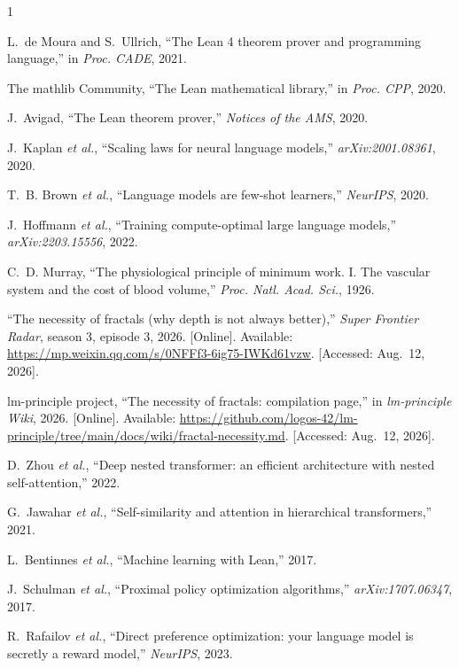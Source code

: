 \documentclass[conference]{IEEEtran}
\begin{document}
\begin{thebibliography}{1}

L.~de Moura and S.~Ullrich, ``The Lean 4 theorem prover and programming
language,'' in \emph{Proc. CADE}, 2021.

The mathlib Community, ``The Lean mathematical library,'' in \emph{Proc. CPP},
2020.

J.~Avigad, ``The Lean theorem prover,'' \emph{Notices of the AMS}, 2020.

J.~Kaplan \emph{et al.}, ``Scaling laws for neural language models,''
\emph{arXiv:2001.08361}, 2020.

T.~B. Brown \emph{et al.}, ``Language models are few-shot learners,''
\emph{NeurIPS}, 2020.

J.~Hoffmann \emph{et al.}, ``Training compute-optimal large language models,''
\emph{arXiv:2203.15556}, 2022.

C.~D. Murray, ``The physiological principle of minimum work. I. The vascular
system and the cost of blood volume,'' \emph{Proc. Natl. Acad. Sci.}, 1926.

``The necessity of fractals (why depth is not always better),'' \emph{Super
Frontier Radar}, season 3, episode 3, 2026. [Online]. Available:
\url{https://mp.weixin.qq.com/s/0NFFf3-6ig75-IWKd61vzw}. [Accessed: Aug.\ 12,
2026].

lm-principle project, ``The necessity of fractals: compilation page,'' in
\emph{lm-principle Wiki}, 2026. [Online]. Available:
\url{https://github.com/logos-42/lm-principle/tree/main/docs/wiki/fractal-necessity.md}.
[Accessed: Aug.\ 12, 2026].

D.~Zhou \emph{et al.}, ``Deep nested transformer: an efficient architecture
with nested self-attention,'' 2022.

G.~Jawahar \emph{et al.}, ``Self-similarity and attention in hierarchical
transformers,'' 2021.

L.~Bentinnes \emph{et al.}, ``Machine learning with Lean,'' 2017.

J.~Schulman \emph{et al.}, ``Proximal policy optimization algorithms,''
\emph{arXiv:1707.06347}, 2017.

R.~Rafailov \emph{et al.}, ``Direct preference optimization: your language
model is secretly a reward model,'' \emph{NeurIPS}, 2023.

\end{thebibliography}
\end{document}
